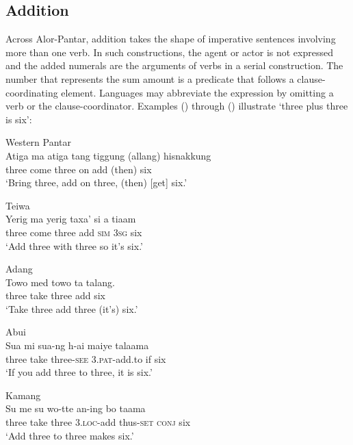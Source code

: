 \subsection{Addition}
Across Alor-Pantar, addition takes the shape of imperative sentences involving more than one verb. In such constructions, the agent or actor is not expressed and the added numerals are the arguments of verbs in a serial construction. The number that represents the sum amount is a predicate that follows a clause-coordinating element. Languages may abbreviate the expression by omitting a verb or the clause-coordinator. Examples () through () illustrate `three plus three is six':


\ea%
\label{bkm:Ref342663714}
Western Pantar \\
\gll Atiga  ma{\footnotemark}  atiga  tang  tiggung  (allang)  hisnakkung\\
   three   come  three  on  add  (then)  six \\
\glt  `Bring three, add on three, (then) [get] six.'
\z
{}


\ea
Teiwa\\
 \gll Yerig  ma  yerig  taxa'   si  a  tiaam\\
   three  come  three  add  \textsc{sim  3sg } six \\
 \glt`Add three with three so it's six.'
\z







\ea
Adang \\
 \gll Towo  med  towo  ta  talang.\\
    three   take   three   add   six\\
 \glt `Take three add three (it's) six.'
\z

\ea
Abui \\
 \gll Sua  mi  sua-ng  h-ai  maiye  talaama\\
  three  take  three-\textsc{see}  \textsc{3.pat}{}-add.to  if  six \\
 \glt  `If you add three to three, it is six.'
\z




\ea%
\label{bkm:Ref342663723}
Kamang\\
\gll   Su  me  su  wo-tte  an-ing  bo  taama\\
   three   take  three  3.\textsc{loc}{}-add  thus-\textsc{set}   \textsc{conj}  six  \\
\glt `Add three to three makes six.'
\z







